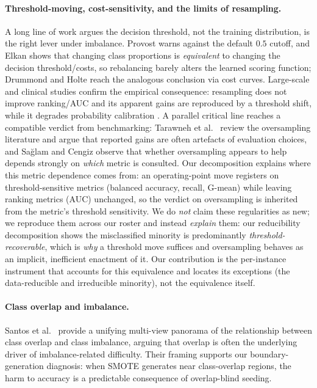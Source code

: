 \paragraph{Threshold-moving, cost-sensitivity, and the limits of resampling.}
A long line of work argues the decision threshold, not the training distribution,
is the right lever under imbalance. Provost \cite{provost2000imbalanced} warns
against the default $0.5$ cutoff, and Elkan \cite{elkan2001foundations} shows that
changing class proportions is \emph{equivalent} to changing the decision
threshold/costs, so rebalancing barely alters the learned scoring function;
Drummond and Holte \cite{drummond2003c45} reach the analogous conclusion via cost
curves. Large-scale and clinical studies confirm the empirical consequence:
resampling does not improve ranking/AUC and its apparent gains are reproduced by a
threshold shift, while it degrades probability calibration
\cite{elor2022smote,goorbergh2022harm,dalpozzolo2015calibrating,carriero2025harms}.
A parallel critical line reaches a compatible verdict from benchmarking:
Tarawneh et al.\ \cite{tarawneh2022stop} review the oversampling literature and
argue that reported gains are often artefacts of evaluation choices, and
Sa{\u{g}}lam and Cengiz \cite{saglam2026uncertainty} observe that whether
oversampling appears to help depends strongly on \emph{which} metric is
consulted. Our decomposition explains where this metric dependence comes from:
an operating-point move registers on threshold-sensitive metrics (balanced
accuracy, recall, G-mean) while leaving ranking metrics (AUC) unchanged, so the
verdict on oversampling is inherited from the metric's threshold sensitivity.
We do \emph{not} claim these regularities as new; we reproduce them across our
roster and instead \emph{explain} them: our reducibility decomposition shows the
misclassified minority is predominantly \emph{threshold-recoverable}, which is
\emph{why} a threshold move suffices and oversampling behaves as an implicit,
inefficient enactment of it. Our contribution is the per-instance instrument that
accounts for this equivalence and locates its exceptions (the data-reducible and
irreducible minority), not the equivalence itself.

\paragraph{Class overlap and imbalance.}
Santos et al.\ \cite{santos2023unifying} provide a unifying multi-view
panorama of the relationship between class overlap and class imbalance,
arguing that overlap is often the underlying driver of imbalance-related
difficulty. Their framing supports our boundary-generation diagnosis: when
SMOTE generates near class-overlap regions, the harm to accuracy is a
predictable consequence of overlap-blind seeding.

